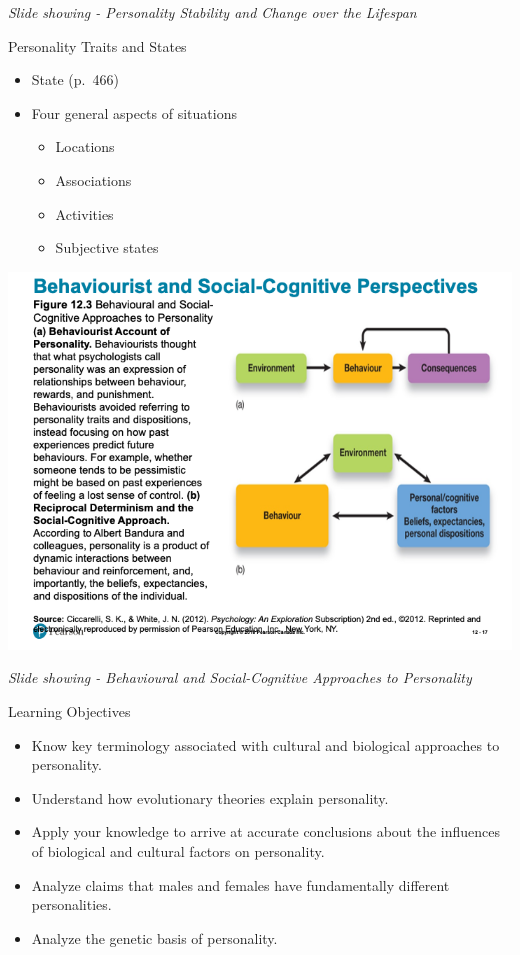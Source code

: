 \documentclass[
]{book}
\providecommand{\tightlist}{%
  \setlength{\itemsep}{0pt}\setlength{\parskip}{0pt}}
\begin{document}
\begin{reflect}
\emph{Slide showing - Personality Stability and Change over the Lifespan}

Personality Traits and States

\begin{itemize}
\tightlist
\item
  State (p.~466)\\
\item
  Four general aspects of situations

  \begin{itemize}
  \tightlist
  \item
    Locations\\
  \item
    Associations\\
  \item
    Activities\\
  \item
    Subjective states
  \end{itemize}
\end{itemize}

\includegraphics{assets/unit_5/slide_17.png}

\emph{Slide showing - Behavioural and Social-Cognitive Approaches to Personality}

Learning Objectives

\begin{itemize}
\tightlist
\item
  Know key terminology associated with cultural and biological approaches to personality.\\
\item
  Understand how evolutionary theories explain personality.\\
\item
  Apply your knowledge to arrive at accurate conclusions about the influences of biological and cultural factors on personality.\\
\item
  Analyze claims that males and females have fundamentally different personalities.\\
\item
  Analyze the genetic basis of personality.
\end{itemize}


\end{reflect}
\end{document}
